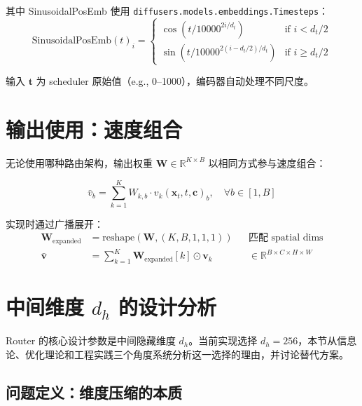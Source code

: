 \documentclass[11pt,a4paper]{article}
\newcommand{\R}{\mathbb{R}}
\begin{document}
其中 SinusoidalPosEmb 使用 \texttt{diffusers.models.embeddings.Timesteps}：
\begin{equation}
\text{SinusoidalPosEmb}(t)_i = \begin{cases}
\cos(t / 10000^{2i/d_t}) & \text{if } i < d_t/2 \\
\sin(t / 10000^{2(i - d_t/2)/d_t}) & \text{if } i \geq d_t/2
\end{cases}
\end{equation}

输入 $\mathbf{t}$ 为 scheduler 原始值（e.g., 0--1000），编码器自动处理不同尺度。

\section{输出使用：速度组合}

无论使用哪种路由架构，输出权重 $\mathbf{W} \in \R^{K \times B}$ 以相同方式参与速度组合：

\begin{equation}
\bar{v}_b = \sum_{k=1}^K W_{k,b} \cdot v_k(\mathbf{x}_t, t, \mathbf{c})_b, \quad \forall b \in [1, B]
\end{equation}

实现时通过广播展开：
\begin{align}
\mathbf{W}_{\text{expanded}} &= \text{reshape}(\mathbf{W}, (K, B, 1, 1, 1)) && \text{匹配 spatial dims} \\
\bar{\mathbf{v}} &= \sum_{k=1}^K \mathbf{W}_{\text{expanded}}[k] \odot \mathbf{v}_k && \in \R^{B \times C \times H \times W}
\end{align}

\newpage
\section{中间维度 $d_h$ 的设计分析}
\label{sec:hidden_dim_analysis}

Router 的核心设计参数是中间隐藏维度 $d_h$。当前实现选择 $d_h = 256$，本节从信息论、优化理论和工程实践三个角度系统分析这一选择的理由，并讨论替代方案。

\subsection{问题定义：维度压缩的本质}
\end{document}
